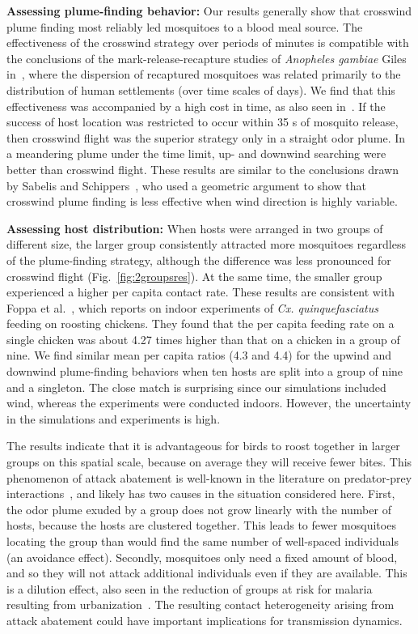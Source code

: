 \documentclass[10pt]{article}
\begin{document}
\textbf{Assessing plume-finding behavior: }
Our results generally show that crosswind plume finding most reliably led mosquitoes to a blood meal source. The effectiveness of the crosswind strategy over periods of minutes is compatible with the conclusions of the mark-release-recapture studies of  \textit{Anopheles gambiae} Giles in~\cite{Gillies1961}, where the dispersion of recaptured mosquitoes was related primarily to the distribution of human settlements (over time scales of days). We find that this effectiveness was accompanied by a high cost in time, as also seen in~\cite{Pasternak2009}. If the success of host location was restricted to occur within 35 s of mosquito release, then crosswind flight was the superior strategy only in a straight odor plume. In a meandering plume under the time limit, up- and downwind searching were better than crosswind flight. These results are similar to the conclusions drawn by Sabelis and Schippers~\cite{Sabelis1984}, who used a geometric argument to show that crosswind plume finding is less effective when wind direction is highly variable. 

%

\textbf{Assessing host distribution:} When hosts were arranged in two groups of different
size, the larger group consistently attracted more mosquitoes
regardless of the plume-finding strategy, although the difference
was less pronounced for crosswind flight (Fig.~\ref{fig:2groupsres}).  At the same time, the smaller group experienced a higher per capita contact rate.
These results are consistent with Foppa et al.~\cite{Foppa2011}, which reports on indoor experiments of \textit{Cx. quinquefasciatus} feeding on roosting chickens. They found that the per capita feeding rate on a single chicken was about 4.27 times higher than that on a chicken in a group of nine. We find similar mean per capita ratios (4.3 and 4.4) for the upwind and downwind plume-finding behaviors when ten hosts are split into a group of nine and a singleton. The close match is surprising since our simulations included wind, whereas the experiments were conducted indoors. However, the uncertainty in the simulations and experiments is high.

The results indicate that it is advantageous for birds to roost together in larger groups on this spatial scale, because on average they will receive fewer bites. This phenomenon of attack abatement is well-known in the literature on predator-prey interactions~\cite{Turner1986}, and likely has two causes in the situation considered here. First, the odor plume exuded by a group does not grow linearly with the number of hosts, because the hosts are clustered together. This leads to fewer mosquitoes locating the group than would find the same number of well-spaced individuals (an avoidance effect). Secondly, mosquitoes only need a fixed amount of blood, and so they will not attack additional individuals even if they are available. This is a dilution effect, also seen in the reduction of groups at risk for malaria resulting from urbanization~\cite{HayEtAl2005}. 
The resulting contact heterogeneity arising from attack abatement could have important
implications for transmission dynamics. 
\end{document}
